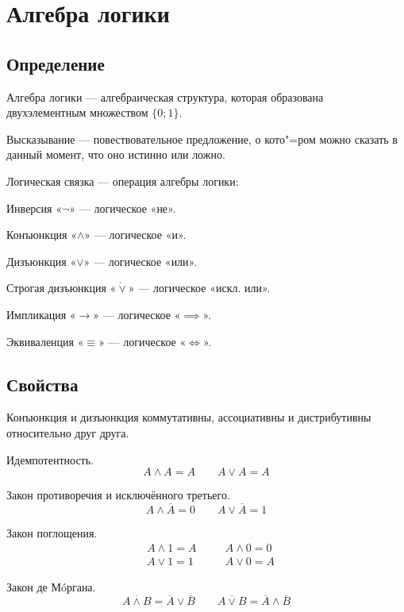 \section{Алгебра логики}

\subsection{Определение}

{\bold Алгебра логики} --- алгебраическая структура, которая образована двухэлементным множеством $\{0;1\}$.

{\bold Высказывание} --- повествовательное предложение, о кото"=ром можно сказать в данный момент, что оно {\ital истинно} или {\ital ложно}.

{\bold Логическая связка} --- операция алгебры логики:
\begin{list*}[][\#]
\item{\ital Инверсия} «$\lnot$» --- логическое {\ital «не»}.
\item{\ital Конъюнкция} «$\land$» --- логическое {\ital «и»}.
\item{\ital Дизъюнкция} «$\lor$» --- логическое {\ital «или»}.
\item{\ital Строгая дизъюнкция} «$\dot{\lor}$» --- логическое {\ital «искл. или»}.
\item{\ital Импликация} «$\rightarrow$» --- логическое {\ital «$\implies$»}.
\item{\ital Эквиваленция} «$\equiv$» --- логическое {\ital «$\iff$»}.
\end{list*}

\subsection{Свойства}

Конъюнкция и дизъюнкция {\ital коммутативны}, {\ital ассоциативны} и {\ital дистрибутивны} относительно друг друга.
\begin{theorem}
{\bold Идемпотентность.}
$$A\land A=A\qquad A\lor A=A$$
\end{theorem}
\begin{theorem}
{\bold Закон противоречия} и {\bold исключённого третьего.}
$$A\land\overline{A}=0\qquad A\lor\overline{A}=1$$
\end{theorem}
\begin{theorem}
{\bold Закон поглощения.}
$$\begin{aligned}
&A\land 1=A &\quad &A\land 0=0\\
&A\lor 1=1 &\quad &A\lor 0=A
\end{aligned}$$
\end{theorem}
\begin{theorem}
{\bold Закон де Мóргана.}
$$\overline{A\land B}=\overline{A}\lor\overline{B}\qquad\overline{A\lor B}=\overline{A}\land\overline{B}$$
\end{theorem}

